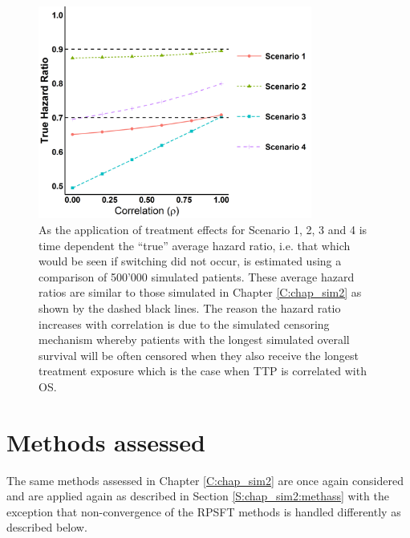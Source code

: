 \begin{figure}[ht]
\centering
\includegraphics[width=9cm]{images/chap_sim3/truehr.png}
\caption{\label{F:chap_sim3:truehr}  As the application of treatment effects for Scenario 1, 2, 3 and 4 is time dependent the ``true'' average hazard ratio, i.e. that which would be seen if switching did not occur, is estimated using a comparison of 500'000 simulated patients. These average hazard ratios are similar to those simulated in Chapter \ref{C:chap_sim2} as shown by the dashed black lines. The reason the hazard ratio increases with correlation is due to the simulated censoring mechanism whereby patients with the longest simulated overall survival will be often censored when they also receive the longest treatment exposure which is the case when TTP is correlated with OS. } 
\end{figure}

\section{Methods assessed}

The same methods assessed in Chapter \ref{C:chap_sim2} are once again considered and are applied again as described in Section \ref{S:chap_sim2:methass} with the exception that non-convergence of the RPSFT methods is handled differently as described below. 

